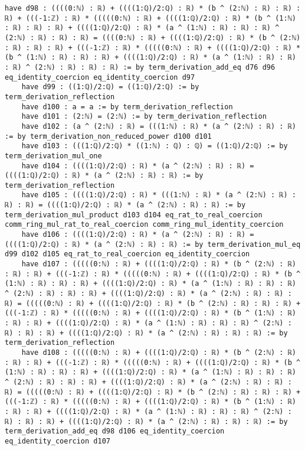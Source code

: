 \documentclass{article}
\begin{document}
\begin{tcolorbox}[colback=white!10, width=\linewidth]
\begin{lstlisting}[language=Lean4]
    have d98 : ((((0:ℕ) : ℝ) + ((((1:ℚ)/2:ℚ) : ℝ) * (b ^ (2:ℕ) : ℝ) : ℝ) : ℝ) + (((-1:ℤ) : ℝ) * (((((0:ℕ) : ℝ) + ((((1:ℚ)/2:ℚ) : ℝ) * (b ^ (1:ℕ) : ℝ) : ℝ) : ℝ) + ((((1:ℚ)/2:ℚ) : ℝ) * (a ^ (1:ℕ) : ℝ) : ℝ) : ℝ) ^ (2:ℕ) : ℝ) : ℝ) : ℝ) = ((((0:ℕ) : ℝ) + ((((1:ℚ)/2:ℚ) : ℝ) * (b ^ (2:ℕ) : ℝ) : ℝ) : ℝ) + (((-1:ℤ) : ℝ) * (((((0:ℕ) : ℝ) + ((((1:ℚ)/2:ℚ) : ℝ) * (b ^ (1:ℕ) : ℝ) : ℝ) : ℝ) + ((((1:ℚ)/2:ℚ) : ℝ) * (a ^ (1:ℕ) : ℝ) : ℝ) : ℝ) ^ (2:ℕ) : ℝ) : ℝ) : ℝ) := by term_derivation_add_eq d76 d96 eq_identity_coercion eq_identity_coercion d97
    have d99 : ((1:ℚ)/2:ℚ) = ((1:ℚ)/2:ℚ) := by term_derivation_reflection
    have d100 : a = a := by term_derivation_reflection
    have d101 : (2:ℕ) = (2:ℕ) := by term_derivation_reflection
    have d102 : (a ^ (2:ℕ) : ℝ) = (((1:ℕ) : ℝ) * (a ^ (2:ℕ) : ℝ) : ℝ) := by term_derivation_non_reduced_power d100 d101
    have d103 : (((1:ℚ)/2:ℚ) * ((1:ℕ) : ℚ) : ℚ) = ((1:ℚ)/2:ℚ) := by term_derivation_mul_one
    have d104 : ((((1:ℚ)/2:ℚ) : ℝ) * (a ^ (2:ℕ) : ℝ) : ℝ) = ((((1:ℚ)/2:ℚ) : ℝ) * (a ^ (2:ℕ) : ℝ) : ℝ) := by term_derivation_reflection
    have d105 : ((((1:ℚ)/2:ℚ) : ℝ) * (((1:ℕ) : ℝ) * (a ^ (2:ℕ) : ℝ) : ℝ) : ℝ) = ((((1:ℚ)/2:ℚ) : ℝ) * (a ^ (2:ℕ) : ℝ) : ℝ) := by term_derivation_mul_product d103 d104 eq_rat_to_real_coercion comm_ring_mul_rat_to_real_coercion comm_ring_mul_identity_coercion
    have d106 : ((((1:ℚ)/2:ℚ) : ℝ) * (a ^ (2:ℕ) : ℝ) : ℝ) = ((((1:ℚ)/2:ℚ) : ℝ) * (a ^ (2:ℕ) : ℝ) : ℝ) := by term_derivation_mul_eq d99 d102 d105 eq_rat_to_real_coercion eq_identity_coercion
    have d107 : (((((0:ℕ) : ℝ) + ((((1:ℚ)/2:ℚ) : ℝ) * (b ^ (2:ℕ) : ℝ) : ℝ) : ℝ) + (((-1:ℤ) : ℝ) * (((((0:ℕ) : ℝ) + ((((1:ℚ)/2:ℚ) : ℝ) * (b ^ (1:ℕ) : ℝ) : ℝ) : ℝ) + ((((1:ℚ)/2:ℚ) : ℝ) * (a ^ (1:ℕ) : ℝ) : ℝ) : ℝ) ^ (2:ℕ) : ℝ) : ℝ) : ℝ) + ((((1:ℚ)/2:ℚ) : ℝ) * (a ^ (2:ℕ) : ℝ) : ℝ) : ℝ) = (((((0:ℕ) : ℝ) + ((((1:ℚ)/2:ℚ) : ℝ) * (b ^ (2:ℕ) : ℝ) : ℝ) : ℝ) + (((-1:ℤ) : ℝ) * (((((0:ℕ) : ℝ) + ((((1:ℚ)/2:ℚ) : ℝ) * (b ^ (1:ℕ) : ℝ) : ℝ) : ℝ) + ((((1:ℚ)/2:ℚ) : ℝ) * (a ^ (1:ℕ) : ℝ) : ℝ) : ℝ) ^ (2:ℕ) : ℝ) : ℝ) : ℝ) + ((((1:ℚ)/2:ℚ) : ℝ) * (a ^ (2:ℕ) : ℝ) : ℝ) : ℝ) := by term_derivation_reflection
    have d108 : (((((0:ℕ) : ℝ) + ((((1:ℚ)/2:ℚ) : ℝ) * (b ^ (2:ℕ) : ℝ) : ℝ) : ℝ) + (((-1:ℤ) : ℝ) * (((((0:ℕ) : ℝ) + ((((1:ℚ)/2:ℚ) : ℝ) * (b ^ (1:ℕ) : ℝ) : ℝ) : ℝ) + ((((1:ℚ)/2:ℚ) : ℝ) * (a ^ (1:ℕ) : ℝ) : ℝ) : ℝ) ^ (2:ℕ) : ℝ) : ℝ) : ℝ) + ((((1:ℚ)/2:ℚ) : ℝ) * (a ^ (2:ℕ) : ℝ) : ℝ) : ℝ) = (((((0:ℕ) : ℝ) + ((((1:ℚ)/2:ℚ) : ℝ) * (b ^ (2:ℕ) : ℝ) : ℝ) : ℝ) + (((-1:ℤ) : ℝ) * (((((0:ℕ) : ℝ) + ((((1:ℚ)/2:ℚ) : ℝ) * (b ^ (1:ℕ) : ℝ) : ℝ) : ℝ) + ((((1:ℚ)/2:ℚ) : ℝ) * (a ^ (1:ℕ) : ℝ) : ℝ) : ℝ) ^ (2:ℕ) : ℝ) : ℝ) : ℝ) + ((((1:ℚ)/2:ℚ) : ℝ) * (a ^ (2:ℕ) : ℝ) : ℝ) : ℝ) := by term_derivation_add_eq d98 d106 eq_identity_coercion eq_identity_coercion d107

\end{lstlisting}
\end{tcolorbox}
\end{document}
